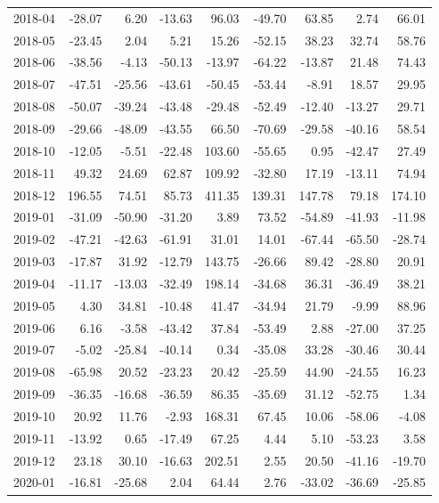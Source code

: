 \begin{table}[ht]
\begin{tabular}{lrrrrrrrr}
  2018-04 & -28.07 & 6.20 & -13.63 & 96.03 & -49.70 & 63.85 & 2.74 & 66.01 \\ 
  2018-05 & -23.45 & 2.04 & 5.21 & 15.26 & -52.15 & 38.23 & 32.74 & 58.76 \\ 
  2018-06 & -38.56 & -4.13 & -50.13 & -13.97 & -64.22 & -13.87 & 21.48 & 74.43 \\ 
  2018-07 & -47.51 & -25.56 & -43.61 & -50.45 & -53.44 & -8.91 & 18.57 & 29.95 \\ 
  2018-08 & -50.07 & -39.24 & -43.48 & -29.48 & -52.49 & -12.40 & -13.27 & 29.71 \\ 
  2018-09 & -29.66 & -48.09 & -43.55 & 66.50 & -70.69 & -29.58 & -40.16 & 58.54 \\ 
  2018-10 & -12.05 & -5.51 & -22.48 & 103.60 & -55.65 & 0.95 & -42.47 & 27.49 \\ 
  2018-11 & 49.32 & 24.69 & 62.87 & 109.92 & -32.80 & 17.19 & -13.11 & 74.94 \\ 
  2018-12 & 196.55 & 74.51 & 85.73 & 411.35 & 139.31 & 147.78 & 79.18 & 174.10 \\ 
  2019-01 & -31.09 & -50.90 & -31.20 & 3.89 & 73.52 & -54.89 & -41.93 & -11.98 \\ 
  2019-02 & -47.21 & -42.63 & -61.91 & 31.01 & 14.01 & -67.44 & -65.50 & -28.74 \\ 
  2019-03 & -17.87 & 31.92 & -12.79 & 143.75 & -26.66 & 89.42 & -28.80 & 20.91 \\ 
  2019-04 & -11.17 & -13.03 & -32.49 & 198.14 & -34.68 & 36.31 & -36.49 & 38.21 \\ 
  2019-05 & 4.30 & 34.81 & -10.48 & 41.47 & -34.94 & 21.79 & -9.99 & 88.96 \\ 
  2019-06 & 6.16 & -3.58 & -43.42 & 37.84 & -53.49 & 2.88 & -27.00 & 37.25 \\ 
  2019-07 & -5.02 & -25.84 & -40.14 & 0.34 & -35.08 & 33.28 & -30.46 & 30.44 \\ 
  2019-08 & -65.98 & 20.52 & -23.23 & 20.42 & -25.59 & 44.90 & -24.55 & 16.23 \\ 
  2019-09 & -36.35 & -16.68 & -36.59 & 86.35 & -35.69 & 31.12 & -52.75 & 1.34 \\ 
  2019-10 & 20.92 & 11.76 & -2.93 & 168.31 & 67.45 & 10.06 & -58.06 & -4.08 \\ 
  2019-11 & -13.92 & 0.65 & -17.49 & 67.25 & 4.44 & 5.10 & -53.23 & 3.58 \\ 
  2019-12 & 23.18 & 30.10 & -16.63 & 202.51 & 2.55 & 20.50 & -41.16 & -19.70 \\ 
  2020-01 & -16.81 & -25.68 & 2.04 & 64.44 & 2.76 & -33.02 & -36.69 & -25.85 \\ 

\end{tabular}
\end{table}
